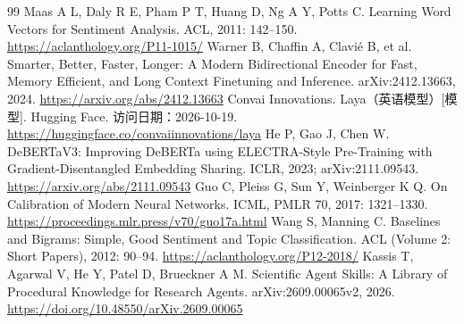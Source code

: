 \documentclass[UTF8,fontset=fandol,a4paper,11pt]{ctexart}
\begin{document}
\FloatBarrier\begin{thebibliography}{99}
 Maas A L, Daly R E, Pham P T, Huang D, Ng A Y, Potts C. Learning Word Vectors for Sentiment Analysis. ACL, 2011: 142–150. \url{https://aclanthology.org/P11-1015/}
 Warner B, Chaffin A, Clavié B, et al. Smarter, Better, Faster, Longer: A Modern Bidirectional Encoder for Fast, Memory Efficient, and Long Context Finetuning and Inference. arXiv:2412.13663, 2024. \url{https://arxiv.org/abs/2412.13663}
 Convai Innovations. Laya（英语模型）[模型]. Hugging Face. 访问日期：2026-10-19. \url{https://huggingface.co/convaiinnovations/laya}
 He P, Gao J, Chen W. DeBERTaV3: Improving DeBERTa using ELECTRA-Style Pre-Training with Gradient-Disentangled Embedding Sharing. ICLR, 2023; arXiv:2111.09543. \url{https://arxiv.org/abs/2111.09543}
 Guo C, Pleiss G, Sun Y, Weinberger K Q. On Calibration of Modern Neural Networks. ICML, PMLR 70, 2017: 1321–1330. \url{https://proceedings.mlr.press/v70/guo17a.html}
 Wang S, Manning C. Baselines and Bigrams: Simple, Good Sentiment and Topic Classification. ACL (Volume 2: Short Papers), 2012: 90–94. \url{https://aclanthology.org/P12-2018/}
 Kassis T, Agarwal V, He Y, Patel D, Brueckner A M. Scientific Agent Skills: A Library of Procedural Knowledge for Research Agents. arXiv:2609.00065v2, 2026. \url{https://doi.org/10.48550/arXiv.2609.00065}
\end{thebibliography}
\end{document}
